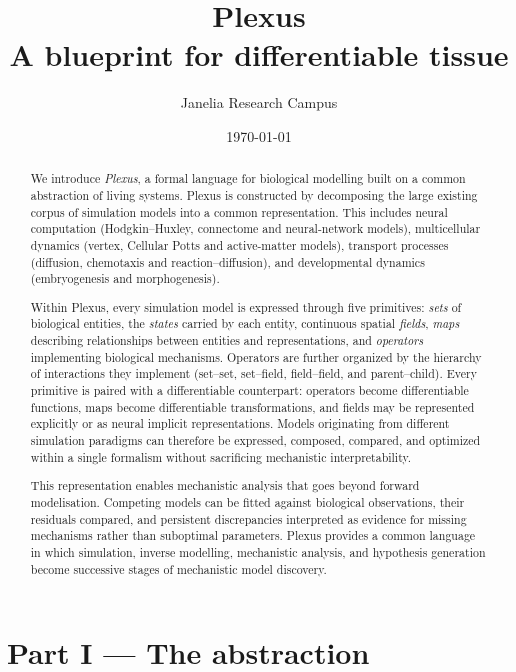 \documentclass[11pt]{article}
\title{\textbf{Plexus}\\[3pt]
\large A blueprint for differentiable tissue}
\author{Janelia Research Campus}
\date{\today}
\begin{document}
\maketitle

\begin{abstract}

We introduce \emph{Plexus}, a formal language for biological modelling built on
a common abstraction of living systems. Plexus is constructed by decomposing the
large existing corpus of simulation models into a common representation. This
includes neural computation (Hodgkin--Huxley, connectome and neural-network
models), multicellular dynamics (vertex, Cellular Potts and active-matter
models), transport processes (diffusion, chemotaxis and reaction--diffusion),
and developmental dynamics (embryogenesis and morphogenesis).

Within Plexus, every simulation model is expressed through five primitives:
\emph{sets} of biological entities, the \emph{states} carried by each entity,
continuous spatial \emph{fields}, \emph{maps} describing relationships between
entities and representations, and \emph{operators} implementing biological
mechanisms. Operators are further organized by the hierarchy of interactions
they implement (set--set, set--field, field--field, and parent--child). Every
primitive is paired with a differentiable counterpart: operators become
differentiable functions, maps become differentiable transformations, and
fields may be represented explicitly or as neural implicit representations.
Models originating from different simulation paradigms can therefore be
expressed, composed, compared, and optimized within a single formalism without
sacrificing mechanistic interpretability.

This representation enables mechanistic analysis that goes beyond forward modelisation.
Competing models can be fitted against biological observations, their residuals
compared, and persistent discrepancies interpreted as evidence for missing
mechanisms rather than suboptimal parameters. Plexus provides a common language 
in which simulation, inverse modelling, mechanistic analysis, and hypothesis generation 
become successive stages of mechanistic model discovery.


\end{abstract}

\part*{Part I --- The abstraction}
\end{document}
